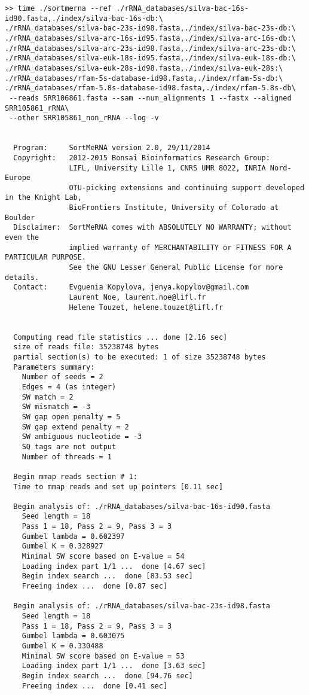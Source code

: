 \documentclass[10pt,a4paper]{article}
\begin{document}
\begin{Verbatim}[fontsize=\footnotesize]
>> time ./sortmerna --ref ./rRNA_databases/silva-bac-16s-id90.fasta,./index/silva-bac-16s-db:\
./rRNA_databases/silva-bac-23s-id98.fasta,./index/silva-bac-23s-db:\
./rRNA_databases/silva-arc-16s-id95.fasta,./index/silva-arc-16s-db:\
./rRNA_databases/silva-arc-23s-id98.fasta,./index/silva-arc-23s-db:\
./rRNA_databases/silva-euk-18s-id95.fasta,./index/silva-euk-18s-db:\
./rRNA_databases/silva-euk-28s-id98.fasta,./index/silva-euk-28s:\
./rRNA_databases/rfam-5s-database-id98.fasta,./index/rfam-5s-db:\
./rRNA_databases/rfam-5.8s-database-id98.fasta,./index/rfam-5.8s-db\
 --reads SRR106861.fasta --sam --num_alignments 1 --fastx --aligned SRR105861_rRNA\
 --other SRR105861_non_rRNA --log -v


  Program:     SortMeRNA version 2.0, 29/11/2014
  Copyright:   2012-2015 Bonsai Bioinformatics Research Group:
               LIFL, University Lille 1, CNRS UMR 8022, INRIA Nord-Europe
               OTU-picking extensions and continuing support developed in the Knight Lab,
               BioFrontiers Institute, University of Colorado at Boulder
  Disclaimer:  SortMeRNA comes with ABSOLUTELY NO WARRANTY; without even the
               implied warranty of MERCHANTABILITY or FITNESS FOR A PARTICULAR PURPOSE.
               See the GNU Lesser General Public License for more details.
  Contact:     Evguenia Kopylova, jenya.kopylov@gmail.com 
               Laurent Noe, laurent.noe@lifl.fr
               Helene Touzet, helene.touzet@lifl.fr


  Computing read file statistics ... done [2.16 sec]
  size of reads file: 35238748 bytes
  partial section(s) to be executed: 1 of size 35238748 bytes 
  Parameters summary:
    Number of seeds = 2
    Edges = 4 (as integer)
    SW match = 2
    SW mismatch = -3
    SW gap open penalty = 5
    SW gap extend penalty = 2
    SW ambiguous nucleotide = -3
    SQ tags are not output
    Number of threads = 1

  Begin mmap reads section # 1:
  Time to mmap reads and set up pointers [0.11 sec]

  Begin analysis of: ./rRNA_databases/silva-bac-16s-id90.fasta
    Seed length = 18
    Pass 1 = 18, Pass 2 = 9, Pass 3 = 3
    Gumbel lambda = 0.602397
    Gumbel K = 0.328927
    Minimal SW score based on E-value = 54
    Loading index part 1/1 ...  done [4.67 sec]
    Begin index search ...  done [83.53 sec]
    Freeing index ...  done [0.87 sec]

  Begin analysis of: ./rRNA_databases/silva-bac-23s-id98.fasta
    Seed length = 18
    Pass 1 = 18, Pass 2 = 9, Pass 3 = 3
    Gumbel lambda = 0.603075
    Gumbel K = 0.330488
    Minimal SW score based on E-value = 53
    Loading index part 1/1 ...  done [3.63 sec]
    Begin index search ...  done [94.76 sec]
    Freeing index ...  done [0.41 sec]


\end{Verbatim}
\end{document}

